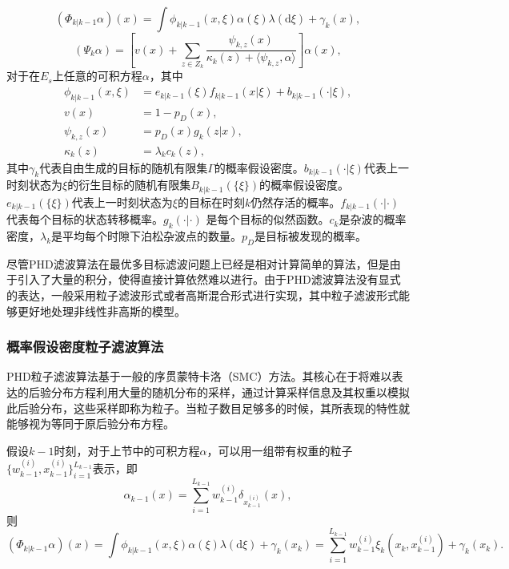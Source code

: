 \begin{equation}\label{Eq:PHD02}
  (\Phi_{k|k-1}\alpha)(x) = \int \phi_{k|k-1}(x,\xi)\alpha(\xi)\lambda(\mathrm{d}\xi)+\gamma_k(x),
\end{equation}
\begin{equation}\label{Eq:PHD03}
  (\Psi_k \alpha) = [v(x) + \sum_{z\in Z_k}\frac{\psi_{k,z}(x)}{\kappa_k(z)+\langle \psi_{k,z},\alpha\rangle}]\alpha(x),
\end{equation}
对于在$E_s$上任意的可积方程$\alpha$，其中
\begin{align}\label{Eq:PHD04}
  \phi_{k|k-1}(x,\xi) &= e_{k|k-1}(\xi)f_{k|k-1}(x|\xi)+b_{k|k-1}(\cdot|\xi),\\
  v(x) &= 1-p_D(x),\\
  \psi_{k,z}(x) &= p_D(x)g_k(z|x),\\
  \kappa_k(z) &= \lambda_kc_k(z),
\end{align}
其中$\gamma_k$代表自由生成的目标的随机有限集$\Gamma$的概率假设密度。$b_{k|k-1}(\cdot|\xi)$代表上一时刻状态为$\xi$的衍生目标的随机有限集$B_{k|k-1}(\{\xi\})$的概率假设密度。$e_{k|k-1}(\{\xi\})$代表上一时刻状态为$\xi$的目标在时刻$k$仍然存活的概率。$f_{k|k-1}(\cdot |\cdot)$代表每个目标的状态转移概率。$g_k(\cdot |\cdot)$ 是每个目标的似然函数。$c_k$是杂波的概率密度，$\lambda_k$是平均每个时隙下泊松杂波点的数量。$p_D$是目标被发现的概率。

尽管PHD滤波算法在最优多目标滤波问题上已经是相对计算简单的算法，但是由于引入了大量的积分，使得直接计算依然难以进行。由于PHD滤波算法没有显式的表达，一般采用粒子滤波形式或者高斯混合形式进行实现，其中粒子滤波形式能够更好地处理非线性非高斯的模型。

\subsubsection{概率假设密度粒子滤波算法}

PHD粒子滤波算法基于一般的序贯蒙特卡洛\cite{vo2005sequential}（SMC）方法。其核心在于将难以表达的后验分布方程利用大量的随机分布的采样，通过计算采样信息及其权重以模拟此后验分布，这些采样即称为粒子。当粒子数目足够多的时候，其所表现的特性就能够视为等同于原后验分布方程。

假设$k-1$时刻，对于上节中的可积方程$\alpha$，可以用一组带有权重的粒子$\{w_{k-1}^{(i)},x_{k-1}^{(i)}\}_{i=1}^{L_{k-1}}$表示，即
\begin{equation}\label{PF1}
  \alpha_{k-1}(x) = \sum_{i=1}^{L_{k-1}}w_{k-1}^{(i)}\delta_{x_{k-1}^{(i)}}(x),
\end{equation}
则
\begin{equation}\label{PF2}
    (\Phi_{k|k-1}\alpha)(x) = \int \phi_{k|k-1}(x,\xi)\alpha(\xi)\lambda(\mathrm{d}\xi)+\gamma_k(x_k) = \sum_{i=1}^{L_{k-1}}w_{k-1}^{(i)}\xi_k(x_k,x_{k-1}^{(i)})+\gamma_k(x_k).
\end{equation}

